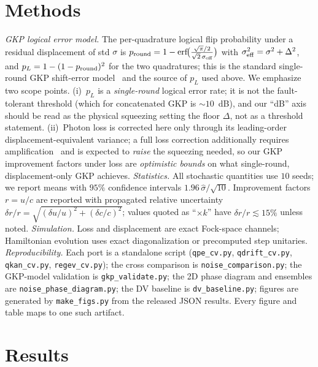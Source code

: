 \documentclass[aps,pra,reprint,superscriptaddress,nofootinbib]{revtex4-2}
\begin{document}
\section{Methods}\label{sec:methods}
\emph{GKP logical error model.} The per-quadrature logical flip probability
under a residual displacement of std $\sigma$ is
$p_{\rm round}=1-\mathrm{erf}\!\big(\tfrac{\sqrt\pi/2}{\sqrt2\,\sigma_{\rm eff}}\big)$
with $\sigma_{\rm eff}^2=\sigma^2+\Delta^2$, and
$p_L=1-(1-p_{\rm round})^{2}$ for the two quadratures; this is the standard
single-round GKP shift-error model~\cite{GKP2001,Glancy2006} and the source
of $p_L$ used above. We
emphasize two scope points. (i)~$p_L$ is a \emph{single-round} logical error
rate; it is not the fault-tolerant threshold (which for concatenated GKP is
$\sim10$~dB), and our ``dB'' axis should be read as the physical squeezing
setting the floor $\Delta$, not as a threshold statement. (ii)~Photon loss is
corrected here only through its leading-order displacement-equivalent variance;
a full loss correction additionally requires
amplification~\cite{Albert2018,Noh2020,Walshe2020} and is expected to
\emph{raise} the squeezing needed, so our GKP improvement factors under loss
are \emph{optimistic bounds} on what single-round, displacement-only GKP
achieves.
\emph{Statistics.} All stochastic quantities use $10$ seeds; we report means
with $95\%$ confidence intervals $1.96\,\hat\sigma/\sqrt{10}$. Improvement
factors $r=u/c$ are reported with propagated relative uncertainty
$\delta r/r=\sqrt{(\delta u/u)^2+(\delta c/c)^2}$; values quoted as ``$\times k$''
have $\delta r/r\lesssim 15\%$ unless noted.
\emph{Simulation.} Loss and displacement are exact Fock-space channels;
Hamiltonian evolution uses exact diagonalization or precomputed step
unitaries. \emph{Reproducibility.} Each port is a standalone script
(\texttt{qpe\_cv.py}, \texttt{qdrift\_cv.py}, \texttt{qkan\_cv.py},
\texttt{regev\_cv.py}); the cross comparison is \texttt{noise\_comparison.py};
the GKP-model validation is \texttt{gkp\_validate.py}; the 2D phase diagram and
ensembles are \texttt{noise\_phase\_diagram.py}; the DV baseline is
\texttt{dv\_baseline.py}; figures are generated by \texttt{make\_figs.py} from
the released JSON results. Every figure and table maps to one such artifact.

\section{Results}
\end{document}
